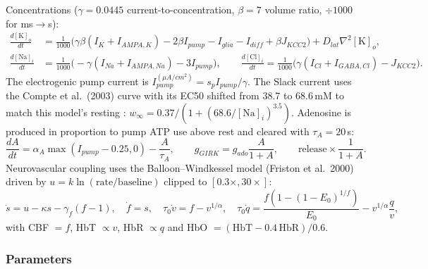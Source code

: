 Concentrations ($\gamma=0.0445$ current-to-concentration, $\beta=7$ volume ratio, $\div1000$ for ms$\to$s):
\begin{align}
\frac{d[\mathrm{K}]_o}{dt} &= \tfrac{1}{1000}\big(\gamma\beta(I_K+I_{AMPA,K}) - 2\beta I_{pump} - I_{glia} - I_{diff} + \beta J_{KCC2}\big) + D_{lat}\nabla^2[\mathrm{K}]_o,\\
\frac{d[\mathrm{Na}]_i}{dt} &= \tfrac{1}{1000}\big(-\gamma(I_{Na}+I_{AMPA,Na}) - 3I_{pump}\big),\qquad
\frac{d[\mathrm{Cl}]_i}{dt} = \tfrac{1}{1000}\big(\gamma(I_{Cl}+I_{GABA,Cl}) - J_{KCC2}\big).
\end{align}
The electrogenic pump current is $I^{(\mu A/cm^2)}_{pump} = s_p I_{pump}/\gamma$. The Slack current uses the Compte et al.\ (2003) curve with its EC50 shifted from 38.7 to 68.6\,mM to match this model's resting \Nai: $w_\infty = 0.37/(1+(68.6/[\mathrm{Na}]_i)^{3.5})$. Adenosine is produced in proportion to pump ATP use above rest and cleared with $\tau_A=20$\,s:
\begin{equation}
\frac{dA}{dt} = \alpha_A\max(I_{pump}-0.25,0) - \frac{A}{\tau_A},\qquad g_{GIRK} = g_{ado}\frac{A}{1+A},\qquad \text{release}\times\frac{1}{1+A}.
\end{equation}
Neurovascular coupling uses the Balloon--Windkessel model (Friston et al.\ 2000) driven by $u = k\ln(\mathrm{rate}/\mathrm{baseline})$ clipped to $[0.3\times,30\times]$:
\begin{equation}
\dot s = u - \kappa s - \gamma_f(f-1),\quad \dot f = s,\quad \tau_0\dot v = f - v^{1/\alpha},\quad
\tau_0\dot q = \frac{f(1-(1-E_0)^{1/f})}{E_0} - v^{1/\alpha}\frac{q}{v},
\end{equation}
with CBF $=f$, HbT $\propto v$, HbR $\propto q$ and HbO $=(\mathrm{HbT}-0.4\,\mathrm{HbR})/0.6$.

\subsubsection{Parameters}

